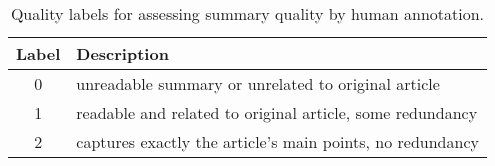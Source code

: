 \begin{table}
    \centering
    \caption{Quality labels for assessing summary quality by human annotation.}
    \label{quality-levels}
    \begin{tabular}{cl}
        \toprule
        Label & Description \\
        \midrule
        0 & unreadable summary or unrelated to original article \\
        1 & readable and related to original article, some redundancy \\
        2 & captures exactly the article's main points, no redundancy \\
        \bottomrule
    \end{tabular}
\end{table}